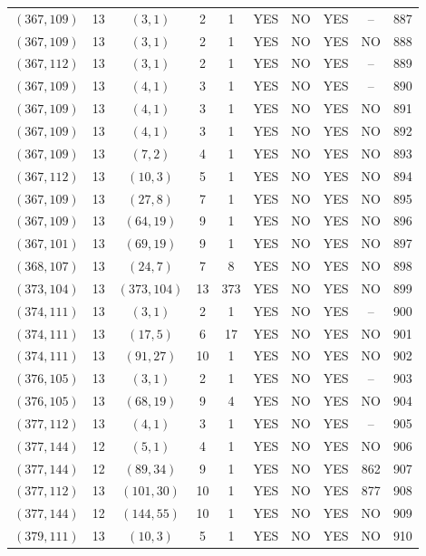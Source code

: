 \begin{longtable}{|c|c|c|c|c|c|c|c|c|c|}
$(367, 109)$ & 13 & $(3, 1)$ & 2 & 1 & YES & NO & YES & -- & 887\\
$(367, 109)$ & 13 & $(3, 1)$ & 2 & 1 & YES & NO & YES & NO & 888\\
$(367, 112)$ & 13 & $(3, 1)$ & 2 & 1 & YES & NO & YES & -- & 889\\
$(367, 109)$ & 13 & $(4, 1)$ & 3 & 1 & YES & NO & YES & -- & 890\\
$(367, 109)$ & 13 & $(4, 1)$ & 3 & 1 & YES & NO & YES & NO & 891\\
$(367, 109)$ & 13 & $(4, 1)$ & 3 & 1 & YES & NO & YES & NO & 892\\
$(367, 109)$ & 13 & $(7, 2)$ & 4 & 1 & YES & NO & YES & NO & 893\\
$(367, 112)$ & 13 & $(10, 3)$ & 5 & 1 & YES & NO & YES & NO & 894\\
$(367, 109)$ & 13 & $(27, 8)$ & 7 & 1 & YES & NO & YES & NO & 895\\
$(367, 109)$ & 13 & $(64, 19)$ & 9 & 1 & YES & NO & YES & NO & 896\\
$(367, 101)$ & 13 & $(69, 19)$ & 9 & 1 & YES & NO & YES & NO & 897\\
$(368, 107)$ & 13 & $(24, 7)$ & 7 & 8 & YES & NO & YES & NO & 898\\
$(373, 104)$ & 13 & $(373, 104)$ & 13 & 373 & YES & NO & YES & NO & 899\\
$(374, 111)$ & 13 & $(3, 1)$ & 2 & 1 & YES & NO & YES & -- & 900\\
$(374, 111)$ & 13 & $(17, 5)$ & 6 & 17 & YES & NO & YES & NO & 901\\
$(374, 111)$ & 13 & $(91, 27)$ & 10 & 1 & YES & NO & YES & NO & 902\\
$(376, 105)$ & 13 & $(3, 1)$ & 2 & 1 & YES & NO & YES & -- & 903\\
$(376, 105)$ & 13 & $(68, 19)$ & 9 & 4 & YES & NO & YES & NO & 904\\
$(377, 112)$ & 13 & $(4, 1)$ & 3 & 1 & YES & NO & YES & -- & 905\\
$(377, 144)$ & 12 & $(5, 1)$ & 4 & 1 & YES & NO & YES & NO & 906\\
$(377, 144)$ & 12 & $(89, 34)$ & 9 & 1 & YES & NO & YES & 862 & 907\\
$(377, 112)$ & 13 & $(101, 30)$ & 10 & 1 & YES & NO & YES & 877 & 908\\
$(377, 144)$ & 12 & $(144, 55)$ & 10 & 1 & YES & NO & YES & NO & 909\\
$(379, 111)$ & 13 & $(10, 3)$ & 5 & 1 & YES & NO & YES & NO & 910\\

\end{longtable}

